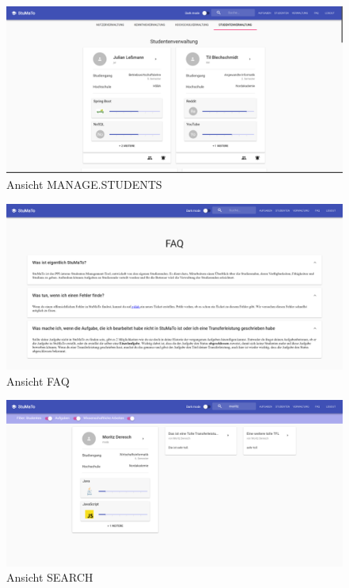 \documentclass[
  12pt,
  ngerman,
  a4paper,
]{article}
\begin{document}
\begin{figure}
\centering
\includegraphics{./tex2pdf.-c803d322dfea80aa/829b0f3718891f438baaea67cf289ebd999fa92d.png}
\caption{Ansicht MANAGE.STUDENTS}
\end{figure}

\begin{figure}
\centering
\includegraphics{./tex2pdf.-c803d322dfea80aa/9ec75c8fe138681c3d2ae6b2dae0f67a3a0aeba6.png}
\caption{Ansicht FAQ}
\end{figure}

\begin{figure}
\centering
\includegraphics{./tex2pdf.-c803d322dfea80aa/b8df625acab593f077a2984960b30c10283f420a.png}
\caption{Ansicht SEARCH}
\end{figure}
\end{document}
